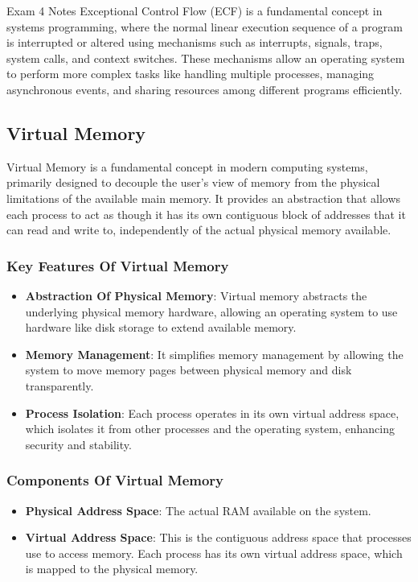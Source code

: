\begin{examnotes}{Exam 4 Notes}
    Exceptional Control Flow (ECF) is a fundamental concept in systems programming, where the normal linear execution sequence of a program is interrupted or altered using mechanisms such as interrupts, 
    signals, traps, system calls, and context switches. These mechanisms allow an operating system to perform more complex tasks like handling multiple processes, managing asynchronous events, and 
    sharing resources among different programs efficiently.

    \subsection*{Virtual Memory}
    
    Virtual Memory is a fundamental concept in modern computing systems, primarily designed to decouple the user's view of memory from the physical limitations of the available main memory. It provides 
    an abstraction that allows each process to act as though it has its own contiguous block of addresses that it can read and write to, independently of the actual physical memory available.

    \subsubsection*{Key Features Of Virtual Memory}

    \begin{itemize}
        \item \textbf{Abstraction Of Physical Memory}: Virtual memory abstracts the underlying physical memory hardware, allowing an operating system to use hardware like disk storage to extend available memory.
        \item \textbf{Memory Management}: It simplifies memory management by allowing the system to move memory pages between physical memory and disk transparently.
        \item \textbf{Process Isolation}: Each process operates in its own virtual address space, which isolates it from other processes and the operating system, enhancing security and stability.
    \end{itemize}

    \subsubsection*{Components Of Virtual Memory}

    \begin{itemize}
        \item \textbf{Physical Address Space}: The actual RAM available on the system.
        \item \textbf{Virtual Address Space}: This is the contiguous address space that processes use to access memory. Each process has its own virtual address space, which is mapped to the physical memory.
    \end{itemize}


\end{examnotes}
